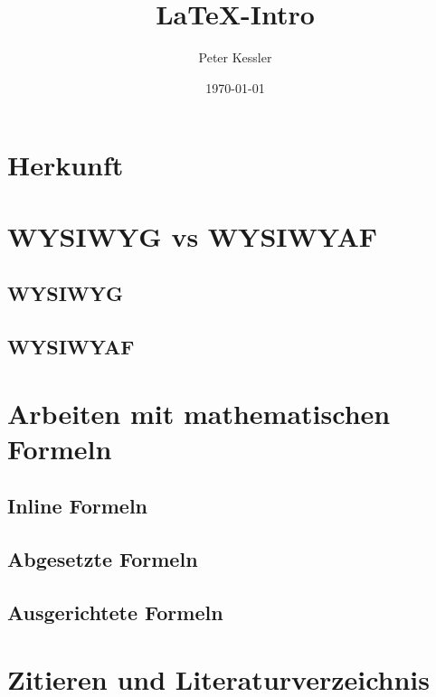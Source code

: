 \documentclass[ 12pt, a4paper, parskip=full]{scrartcl}
\title{\LaTeX-Intro}          %
\author{Peter Kessler}        %
\date{\today}                 %
\begin{document}
\maketitle
\thispagestyle{empty}         

\pagebreak
\tableofcontents

\pagebreak 
\section{Herkunft}


\pagebreak
\section{WYSIWYG vs WYSIWYAF}

\subsection{WYSIWYG}


\subsection{WYSIWYAF}


\pagebreak
\section{Arbeiten mit mathematischen Formeln}


\subsection{Inline Formeln}


\subsection{Abgesetzte Formeln}


\subsection{Ausgerichtete Formeln}


\pagebreak
\section{Zitieren und Literaturverzeichnis}


\pagebreak


\printbibliography[title={Literatur- \& Quellenverzeichnis}]        
\end{document}
